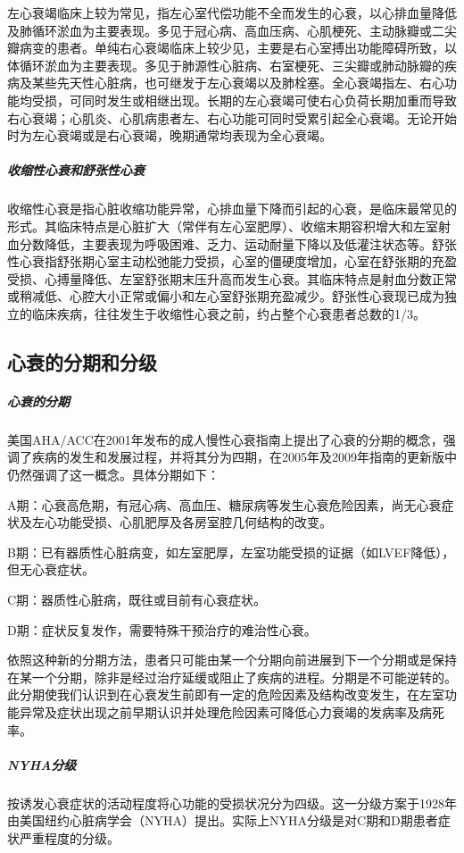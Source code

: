 左心衰竭临床上较为常见，指左心室代偿功能不全而发生的心衰，以心排血量降低及肺循环淤血为主要表现。多见于冠心病、高血压病、心肌梗死、主动脉瓣或二尖瓣病变的患者。单纯右心衰竭临床上较少见，主要是右心室搏出功能障碍所致，以体循环淤血为主要表现。多见于肺源性心脏病、右室梗死、三尖瓣或肺动脉瓣的疾病及某些先天性心脏病，也可继发于左心衰竭以及肺栓塞。全心衰竭指左、右心功能均受损，可同时发生或相继出现。长期的左心衰竭可使右心负荷长期加重而导致右心衰竭；心肌炎、心肌病患者左、右心功能可同时受累引起全心衰竭。无论开始时为左心衰竭或是右心衰竭，晚期通常均表现为全心衰竭。

\subparagraph{收缩性心衰和舒张性心衰}

收缩性心衰是指心脏收缩功能异常，心排血量下降而引起的心衰，是临床最常见的形式。其临床特点是心脏扩大（常伴有左心室肥厚）、收缩末期容积增大和左室射血分数降低，主要表现为呼吸困难、乏力、运动耐量下降以及低灌注状态等。舒张性心衰指舒张期心室主动松弛能力受损，心室的僵硬度增加，心室在舒张期的充盈受损、心搏量降低、左室舒张期末压升高而发生心衰。其临床特点是射血分数正常或稍减低、心腔大小正常或偏小和左心室舒张期充盈减少。舒张性心衰现已成为独立的临床疾病，往往发生于收缩性心衰之前，约占整个心衰患者总数的1/3。

\subsection{心衰的分期和分级}

\subparagraph{心衰的分期}

美国AHA/ACC在2001年发布的成人慢性心衰指南上提出了心衰的分期的概念，强调了疾病的发生和发展过程，并将其分为四期，在2005年及2009年指南的更新版中仍然强调了这一概念。具体分期如下：

A期：心衰高危期，有冠心病、高血压、糖尿病等发生心衰危险因素，尚无心衰症状及左心功能受损、心肌肥厚及各房室腔几何结构的改变。

B期：已有器质性心脏病变，如左室肥厚，左室功能受损的证据（如LVEF降低），但无心衰症状。

C期：器质性心脏病，既往或目前有心衰症状。

D期：症状反复发作，需要特殊干预治疗的难治性心衰。

依照这种新的分期方法，患者只可能由某一个分期向前进展到下一个分期或是保持在某一个分期，除非是经过治疗延缓或阻止了疾病的进程。分期是不可能逆转的。此分期使我们认识到在心衰发生前即有一定的危险因素及结构改变发生，在左室功能异常及症状出现之前早期认识并处理危险因素可降低心力衰竭的发病率及病死率。

\subparagraph{NYHA分级}

按诱发心衰症状的活动程度将心功能的受损状况分为四级。这一分级方案于1928年由美国纽约心脏病学会（NYHA）提出。实际上NYHA分级是对C期和D期患者症状严重程度的分级。

